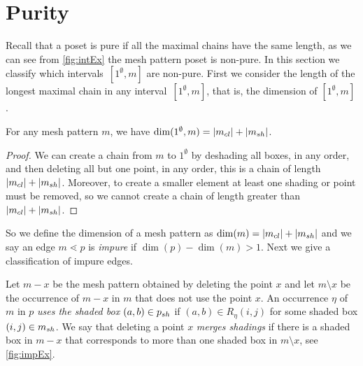 \documentclass[11pt,a4paper,oneside]{article}
\begin{document}
\section{Purity}\label{sec:purity}
Recall that a poset is pure if all the maximal chains have the same length, as we
can see from \cref{fig:intEx} the mesh pattern poset is non-pure. In this section we classify 
which intervals~$[1^\emptyset,m]$ are non-pure. First we consider the length of the longest maximal chain in
any interval~$[1^\emptyset,m]$, that is, the dimension of $[1^\emptyset,m]$.

\begin{lem}
For any mesh pattern $m$, we have $\dim(1^\emptyset,m)=|m_{cl}|+|m_{sh}|$.
\begin{proof}
We can create a chain from $m$ to $1^\emptyset$ by deshading all boxes, in any order,
and then deleting all but one point, in any order, this is a chain of length $|m_{cl}|+|m_{sh}|$.
Moreover, to create a smaller element at least one shading or point must be removed,
 so we cannot create a chain of length greater than $|m_{cl}|+|m_{sh}|$.
\end{proof}
\end{lem}



So we define the dimension of a mesh pattern as $\dim(m)=|m_{cl}|+|m_{sh}|$ and we say an 
edge $m\lessdot p$ is \emph{impure} if $\dim(p)-\dim(m)>1$.
Next we give a classification of impure edges.

 Let $m-x$ be the mesh pattern obtained by deleting the
point $x$ and let $m\setminus x$ be the occurrence of $m-x$ in $m$ that does not
use the point $x$. An occurrence $\eta$ of $m$ in $p$ \emph{uses the shaded box $(a,b)\in p_{sh}$}
if $(a,b)\in R_\eta(i,j)$ for some shaded box $(i,j)\in m_{sh}$. We say that
deleting a point $x$ \emph{merges shadings} if
there is a shaded box in $m-x$ that corresponds to more than one shaded box in
$m\setminus x$, see \cref{fig:impEx}.
\end{document}
